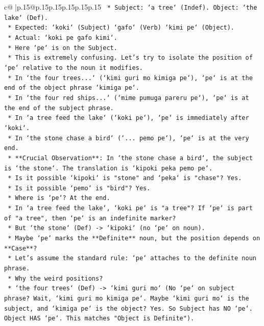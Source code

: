\documentclass{article}
\begin{document}
{\begin{supertabular}{c@{$\;$}|p{.15\linewidth}@{}p{.15\linewidth}p{.15\linewidth}p{.15\linewidth}p{.15\linewidth}p{.15\linewidth}}
{{{\texttt{                    *   Subject: `a tree` (Indef). Object: `the lake` (Def).} \\
\texttt{                    *   Expected: `koki` (Subject) `gafo` (Verb) `kimi pe` (Object).} \\
\texttt{                    *   Actual: `koki pe gafo kimi`.} \\
\texttt{                    *   Here `pe` is on the Subject.} \\
\texttt{                    *   This is extremely confusing. Let's try to isolate the position of `pe` relative to the noun it modifies.} \\
\texttt{                    *   In `the four trees...` (`kimi guri mo kimiga pe`), `pe` is at the end of the object phrase `kimiga pe`.} \\
\texttt{                    *   In `the four red ships...` (`mime pumuga pareru pe`), `pe` is at the end of the subject phrase.} \\
\texttt{                    *   In `a tree feed the lake` (`koki pe`), `pe` is immediately after `koki`.} \\
\texttt{                    *   In `the stone chase a bird` (`... pemo pe`), `pe` is at the very end.} \\
\texttt{                    *   **Crucial Observation**: In `the stone chase a bird`, the subject is `the stone`. The translation is `kipoki peka pemo pe`.} \\
\texttt{                    *   Is it possible `kipoki` is "stone" and `peka` is "chase"? Yes.} \\
\texttt{                    *   Is it possible `pemo` is "bird"? Yes.} \\
\texttt{                    *   Where is `pe`? At the end.} \\
\texttt{                    *   In `a tree feed the lake`, `koki pe` is "a tree"? If `pe` is part of "a tree", then `pe` is an indefinite marker?} \\
\texttt{                    *   But `the stone` (Def) {-}> `kipoki` (no `pe` on noun).} \\
\texttt{                    *   Maybe `pe` marks the **Definite** noun, but the position depends on **Case**?} \\
\texttt{                    *   Let's assume the standard rule: `pe` attaches to the definite noun phrase.} \\
\texttt{                    *   Why the weird positions?} \\
\texttt{                        *   `the four trees` (Def) {-}> `kimi guri mo` (No `pe` on subject phrase? Wait, `kimi guri mo kimiga pe`. Maybe `kimi guri mo` is the subject, and `kimiga pe` is the object? Yes. So Subject has NO `pe`. Object HAS `pe`. This matches "Object is Definite").} \\
}}}
\end{supertabular}}
\end{document}
